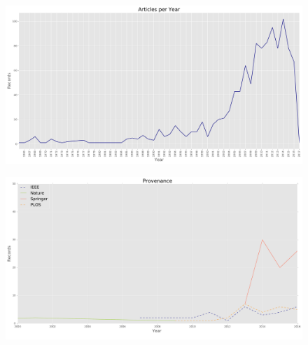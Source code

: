 \documentclass{beamer}
\begin{document}
\begin{frame}
\begin{center}
\begin{figure}[H]
    
\end{figure}
\end{center}
\end{frame}

\begin{frame}
\begin{center}
\begin{figure}[]
        \includegraphics[width=\textwidth]{static/articles-year.pdf}
\end{figure}
\end{center}
\end{frame}

\begin{frame}
\begin{center}
\begin{figure}[]
        \includegraphics[width=\textwidth]{static/provenance.pdf}
\end{figure}
\end{center}
\end{frame}
\end{document}
